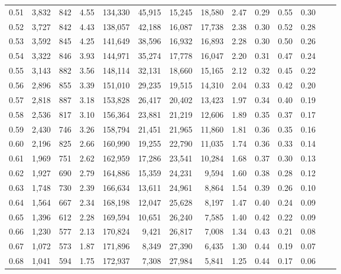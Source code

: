 \begin{tabular}{rrrrrrrrrrrrrr}
0.51 &  3,832 &  842 &    4.55 &  134,330 &   45,915 &  15,245 &  18,580 &  2.47 &  0.29 &  0.55 &      0.30 \\
0.52 &  3,727 &  842 &    4.43 &  138,057 &   42,188 &  16,087 &  17,738 &  2.38 &  0.30 &  0.52 &      0.28 \\
0.53 &  3,592 &  845 &    4.25 &  141,649 &   38,596 &  16,932 &  16,893 &  2.28 &  0.30 &  0.50 &      0.26 \\
0.54 &  3,322 &  846 &    3.93 &  144,971 &   35,274 &  17,778 &  16,047 &  2.20 &  0.31 &  0.47 &      0.24 \\
0.55 &  3,143 &  882 &    3.56 &  148,114 &   32,131 &  18,660 &  15,165 &  2.12 &  0.32 &  0.45 &      0.22 \\
0.56 &  2,896 &  855 &    3.39 &  151,010 &   29,235 &  19,515 &  14,310 &  2.04 &  0.33 &  0.42 &      0.20 \\
0.57 &  2,818 &  887 &    3.18 &  153,828 &   26,417 &  20,402 &  13,423 &  1.97 &  0.34 &  0.40 &      0.19 \\
0.58 &  2,536 &  817 &    3.10 &  156,364 &   23,881 &  21,219 &  12,606 &  1.89 &  0.35 &  0.37 &      0.17 \\
0.59 &  2,430 &  746 &    3.26 &  158,794 &   21,451 &  21,965 &  11,860 &  1.81 &  0.36 &  0.35 &      0.16 \\
0.60 &  2,196 &  825 &    2.66 &  160,990 &   19,255 &  22,790 &  11,035 &  1.74 &  0.36 &  0.33 &      0.14 \\
0.61 &  1,969 &  751 &    2.62 &  162,959 &   17,286 &  23,541 &  10,284 &  1.68 &  0.37 &  0.30 &      0.13 \\
0.62 &  1,927 &  690 &    2.79 &  164,886 &   15,359 &  24,231 &   9,594 &  1.60 &  0.38 &  0.28 &      0.12 \\
0.63 &  1,748 &  730 &    2.39 &  166,634 &   13,611 &  24,961 &   8,864 &  1.54 &  0.39 &  0.26 &      0.10 \\
0.64 &  1,564 &  667 &    2.34 &  168,198 &   12,047 &  25,628 &   8,197 &  1.47 &  0.40 &  0.24 &      0.09 \\
0.65 &  1,396 &  612 &    2.28 &  169,594 &   10,651 &  26,240 &   7,585 &  1.40 &  0.42 &  0.22 &      0.09 \\
0.66 &  1,230 &  577 &    2.13 &  170,824 &    9,421 &  26,817 &   7,008 &  1.34 &  0.43 &  0.21 &      0.08 \\
0.67 &  1,072 &  573 &    1.87 &  171,896 &    8,349 &  27,390 &   6,435 &  1.30 &  0.44 &  0.19 &      0.07 \\
0.68 &  1,041 &  594 &    1.75 &  172,937 &    7,308 &  27,984 &   5,841 &  1.25 &  0.44 &  0.17 &      0.06 \\

\end{tabular}
